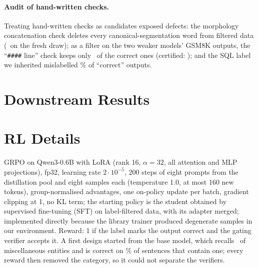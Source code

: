 \documentclass[11pt]{article}
\begin{document}
\paragraph{Audit of hand-written checks.} Treating hand-written checks as
candidates exposed defects: the morphology concatenation check deletes
every canonical-segmentation word from filtered data
(\frSubHwMorphCanonicalDiffersFromSurface\ on the fresh draw); as a filter
on the two weaker models' GSM8K outputs, the ``\texttt{\#\#\#\#} line''
check keeps only \wkRecHwMath\ of the correct ones (certified:
\wkRecCertMath); and the SQL label we inherited mislabelled
\% of ``correct'' outputs.

\section{Downstream Results}\label{app:down}
\begin{table}[h]\centering\footnotesize
\setlength{\tabcolsep}{2.4pt}
\caption{\textbf{Downstream effects} (Qwen3 students; CoNLL test, 555
inputs; Few-NERD test, 592 inputs; ``Misc.'': sentences with a
miscellaneous entity). Distillation
trains on outputs kept by each filter from 2{,}000 fresh inputs; RL starts
from a student fine-tuned on label-filtered data and gates the reward with
each verifier (GRPO, 200 steps; mean$\pm$s.d.\ over seeds, or values per seed when there are two).}
\label{tab:down}
\end{table}

\section{RL Details}\label{app:rl}
GRPO \citep{shao2024deepseekmath} on Qwen3-0.6B \citep{qwen3report} with
LoRA \citep{hu2022lora} (rank 16, $\alpha=32$, all attention and MLP
projections), fp32, learning rate $2\cdot10^{-5}$, 200 steps of eight
prompts from the distillation pool and eight samples each (temperature 1.0,
at most 160 new tokens), group-normalised advantages, one on-policy update
per batch, gradient clipping at 1, no KL term; the starting policy is the
student obtained by supervised fine-tuning (SFT) on label-filtered data,
with its adapter merged; implemented directly because the library trainer
produced degenerate samples in our environment. Reward: 1 if the label marks
the output correct and the gating verifier accepts it. A first design
started from the base model, which recalls \rlRecBase\ of miscellaneous
entities and is correct on \rlElseBase\% of sentences that contain one; every reward then removed the category, so it could not separate the
verifiers.
\end{document}
